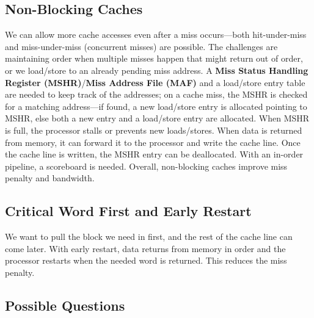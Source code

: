 \documentclass{article}
\begin{document}
\subsection{Non-Blocking Caches}

We can allow more cache accesses even after a miss occurs---both hit-under-miss and miss-under-miss (concurrent misses) are possible. The challenges are maintaining order when multiple misses happen that might return out of order, or we load/store to an already pending miss address. A \textbf{Miss Status Handling Register (MSHR)}/\textbf{Miss Address File (MAF)} and a load/store entry table are needed to keep track of the addresses; on a cache miss, the MSHR is checked for a matching address---if found, a new load/store entry is allocated pointing to MSHR, else both a new entry and a load/store entry are allocated. When MSHR is full, the processor stalls or prevents new loads/stores. When data is returned from memory, it can forward it to the processor and write the cache line. Once the cache line is written, the MSHR entry can be deallocated. With an in-order pipeline, a scoreboard is needed. Overall, non-blocking caches improve miss penalty and bandwidth.

\subsection{Critical Word First and Early Restart}

We want to pull the block we need in first, and the rest of the cache line can come later. With early restart, data returns from memory in order and the processor restarts when the needed word is returned. This reduces the miss penalty.

\subsection{Possible Questions}
\end{document}
